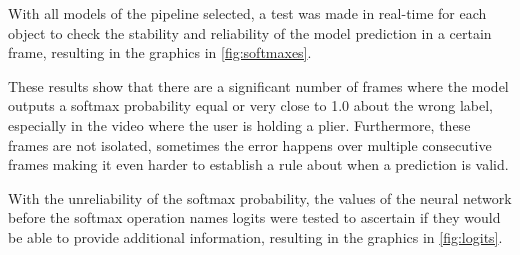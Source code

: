With all models of the pipeline selected, a test was made in real-time for each object to check the stability and reliability of the model prediction in a certain frame, resulting in the graphics in \autoref{fig:softmaxes}.

\begin{figure}[H]%
    \centering
    \begin{subfigure}[b]{0.8\columnwidth}
        {\fontsize{8}{10}\selectfont}
        \caption{\centering}
    \end{subfigure}
    \par\medskip
    \begin{subfigure}[b]{0.8\columnwidth}
        {\fontsize{8}{10}\selectfont}
        \caption{\centering}
    \end{subfigure}
    \par\medskip
    \begin{subfigure}[b]{0.8\columnwidth}
        {\fontsize{8}{10}\selectfont}
        \caption{\centering}
    \end{subfigure}
    \par\medskip
    \begin{subfigure}[b]{0.8\columnwidth}
        {\fontsize{8}{10}\selectfont}
        \caption{\centering}
    \end{subfigure}
    \caption{}
    \label{fig:softmaxes}
\end{figure}

These results show that there are a significant number of frames where the model outputs a softmax probability equal or very close to \num{1.0} about the wrong label, especially in the video where the user is holding a plier. Furthermore, these frames are not isolated, sometimes the error happens over multiple consecutive frames making it even harder to establish a rule about when a prediction is valid.

With the unreliability of the softmax probability, the values of the neural network before the softmax operation names logits were tested to ascertain if they would be able to provide additional information, resulting in the graphics in \autoref{fig:logits}.


